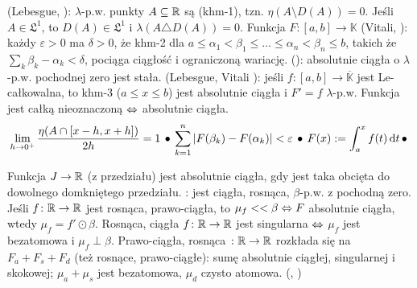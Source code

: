  (Lebesgue, ): $\lambda$-p.w. punkty $A \subseteq \mathbb{R}$ są  (khm-1), tzn. $\eta (A \setminus D(A)) = 0$.
Jeśli $A \in \mathfrak L^1$, to $D(A) \in \mathfrak L^1$ i $\lambda(A \triangle D(A)) = 0$.
Funkcja $F \colon [a,b] \to \mathbb K$  (Vitali, ): każdy $\varepsilon > 0$ ma $\delta > 0$, że khm-2 dla $a \le \alpha_1 < \beta_1 \le \ldots \le \alpha_n < \beta_n \le b$, takich że $\sum_k \beta_k - \alpha_k < \delta$, pociąga ciągłość i ograniczoną wariację.
 (): absolutnie ciągła o $\lambda$-p.w. pochodnej zero jest stała.
 (Lebesgue, Vitali ): jeśli $f \colon [a,b] \to \overline {\mathbb K}$ jest Le-całkowalna, to khm-3 ($a \le x \le b$) jest absolutnie ciągła i $F' = f$ $\lambda$-p.w.
Funkcja jest całką nieoznaczoną $\Leftrightarrow$ absolutnie ciągła.
\[
	\lim_{h \to 0^+} \frac{\eta(A \cap [x-h, x+h])}{2h} = 1 \, \bullet \,
	\sum_{k=1}^n |F(\beta_k) - F(\alpha_k)| < \varepsilon \, \bullet \,
	F(x) := \int_a^x f(t) \,\textrm{d}t \, \bullet \,
\]

Funkcja $J \to \mathbb{R}$ (z przedziału) jest absolutnie ciągła, gdy jest taka obcięta do dowolnego domkniętego przedziału.
: jest ciągła, rosnąca, $\beta$-p.w. z pochodną zero.
Jeśli $f \colon \mathbb{R} \to \mathbb{R}$ jest rosnąca, prawo-ciągła, to $\mu_f << \beta \Leftrightarrow F$ absolutnie ciągła, wtedy $\mu_f = f' \odot \beta$.
Rosnąca, ciągła $f \colon \mathbb{R} \to \mathbb{R}$ jest singularna $\Leftrightarrow$ $\mu_f$ jest bezatomowa i $\mu_f \perp \beta$.
Prawo-ciągła, rosnąca $ \colon \mathbb{R} \to \mathbb{R}$ rozkłada się na $F_a + F_s + F_d$ (też rosnące, prawo-ciągłe): sumę absolutnie ciągłej, singularnej i skokowej; $\mu_a + \mu_s$ jest bezatomowa, $\mu_d$ czysto atomowa. (, )